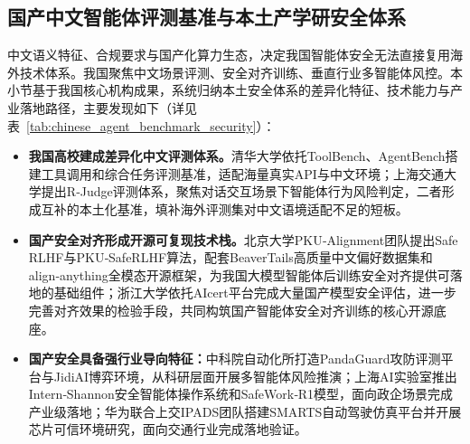 \subsection{国产中文智能体评测基准与本土产学研安全体系}
中文语义特征、合规要求与国产化算力生态，决定我国智能体安全无法直接复用海外技术体系。我国聚焦中文场景评测、安全对齐训练、垂直行业多智能体风控\cite{pandaguardCASIA2026}。本小节基于我国核心机构成果，系统归纳本土安全体系的差异化特征、技术能力与产业落地路径，主要发现如下（详见表~\ref{tab:chinese_agent_benchmark_security}）：
\begin{itemize}[tabitem]
    \item \textbf{我国高校建成差异化中文评测体系。}清华大学依托ToolBench、AgentBench搭建工具调用和综合任务评测基准，适配海量真实API与中文环境；上海交通大学提出R‑Judge评测体系，聚焦对话交互场景下智能体行为风险判定，二者形成互补的本土化基准，填补海外评测集对中文语境适配不足的短板。

    \item \textbf{国产安全对齐形成开源可复现技术栈。}北京大学PKU‑Alignment团队提出Safe RLHF与PKU‑SafeRLHF算法，配套BeaverTails高质量中文偏好数据集和align‑anything全模态开源框架，为我国大模型智能体后训练安全对齐提供可落地的基础组件\cite{pkuAlignAnything2026}；浙江大学依托AIcert平台完成大量国产模型安全评估，进一步完善对齐效果的检验手段，共同构筑国产智能体安全对齐训练的核心开源底座\cite{aicertZJU2026}。

    \item \textbf{国产安全具备强行业导向特征：}中科院自动化所打造PandaGuard攻防评测平台与JidiAI博弈环境，从科研层面开展多智能体风险推演\cite{pandaguardCASIA2026,jidiAI2026}；上海AI实验室推出Intern‑Shannon安全智能体操作系统和SafeWork‑R1模型，面向政企场景完成产业级落地\cite{intershannon2026,safework2025}；华为联合上交IPADS团队搭建SMARTS自动驾驶仿真平台并开展芯片可信环境研究，面向交通行业完成落地验证\cite{noahArkSMARTS2026,ipadsSJTU2026}。
\end{itemize}



\begingroup

